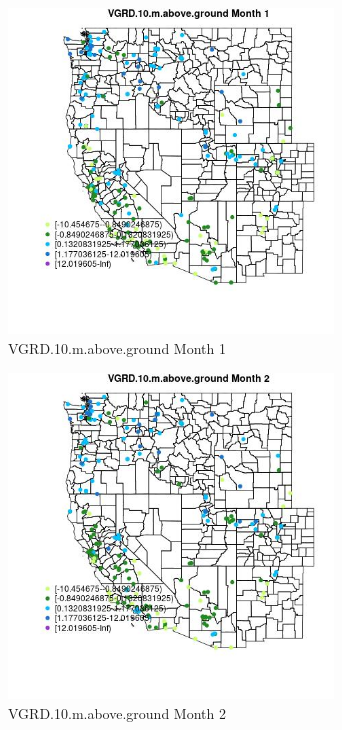 \begin{figure} 
\centering  
\includegraphics[width=0.77\textwidth]{Code_Outputs/Report_ML_input_PM25_Step4_part_e_de_duplicated_aveswNAs_MapObsMo1VGRD10maboveground.jpg} 
\caption{\label{fig:Report_ML_input_PM25_Step4_part_e_de_duplicated_aveswNAsMapObsMo1VGRD10maboveground}VGRD.10.m.above.ground Month 1} 
\end{figure} 
 

\begin{figure} 
\centering  
\includegraphics[width=0.77\textwidth]{Code_Outputs/Report_ML_input_PM25_Step4_part_e_de_duplicated_aveswNAs_MapObsMo2VGRD10maboveground.jpg} 
\caption{\label{fig:Report_ML_input_PM25_Step4_part_e_de_duplicated_aveswNAsMapObsMo2VGRD10maboveground}VGRD.10.m.above.ground Month 2} 
\end{figure} 
 

